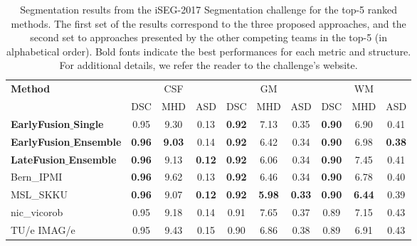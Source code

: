 \documentclass[twoside,espcrc2]{elsarticle}
\begin{document}
\begin{table}[ht!]
\centering
\caption{Segmentation results from the iSEG-2017 Segmentation challenge for the top-5 ranked methods. The first set of the results correspond to the three proposed approaches, and the second set to approaches presented by the other competing teams in the top-5 (in alphabetical order). Bold fonts indicate the best performances for each metric and structure. For additional details, we refer the reader to the challenge's website.}
\label{table:results}
\begin{small}
\begin{tabular}{lccccccccc}
\toprule
\multirow{2}[3]{*}{\textbf{Method}} & \multicolumn{3}{c}{{CSF}} & \multicolumn{3}{c}{{GM}} & \multicolumn{3}{c}{{WM}} \\
\cmidrule(lr){2-4}\cmidrule(lr){5-7}\cmidrule(lr){8-10}
& {DSC} & {MHD} & {ASD} & \multicolumn{1}{l}{{DSC}} & \multicolumn{1}{l}{{MHD}} & \multicolumn{1}{l}{{ASD}} & \multicolumn{1}{l}{{DSC}} & \multicolumn{1}{l}{{MHD}} & \multicolumn{1}{l}{{ASD}} \\
\midrule\midrule
\textbf{EarlyFusion$\_$Single}      & 0.95  & 9.30  & 0.13 & \textbf{0.92} & 7.13 & 0.35 & \textbf{0.90} & 6.90 & 0.41  \\
\textbf{EarlyFusion$\_$Ensemble} & \textbf{0.96} & \textbf{9.03} & 0.14 & \textbf{0.92} & 6.42  & 0.34  & \textbf{0.90}  & 6.98  & \textbf{0.38}\\
\textbf{LateFusion$\_$Ensemble} & \textbf{0.96} & 9.13   & \textbf{0.12}  &  \textbf{0.92} & 6.06 & 0.34  & \textbf{0.90}  & 7.45 & 0.41\\
\midrule
Bern\_IPMI & \textbf{0.96} & 9.62 & 0.13 & \textbf{0.92} & 6.46 & 0.34 & \textbf{0.90} & 6.78 & 0.40 \\
MSL\_SKKU & \textbf{0.96} & 9.07 & \textbf{0.12} & \textbf{0.92} & \textbf{5.98} & \textbf{0.33} & \textbf{0.90} & \textbf{6.44} & 0.39 \\
nic\_vicorob & 0.95 & 9.18 & 0.14 & 0.91 & 7.65 & 0.37 & 0.89 & 7.15 & 0.43 \\
TU/e IMAG/e & 0.95  & 9.43  & 0.15 & 0.90 & 6.86 & 0.38 & 0.89 & 6.91 & 0.43  \\

\bottomrule
\end{tabular}
\end{small}
\end{table}
\end{document}
